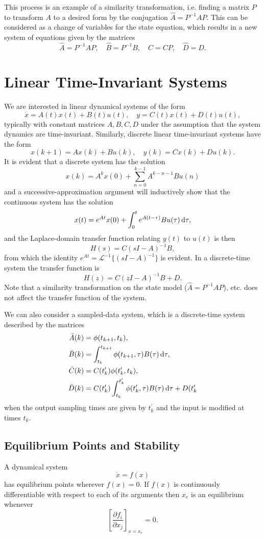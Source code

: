 \documentclass{report}
\begin{document}
This process is an example of a similarity transformation,
i.e. finding a matrix $P$ to transform $A$ to a desired form by the
conjugation $\hat{A} = P^{-1} A P$. This can be considered as a change
of variables for the state equation, which results in a new system of
equations given by the matrices
$$
\hat{A} = P^{-1} A P, \quad
\hat{B} = P^{-1} B, \quad
\hat{C} = C P, \quad
\hat{D} = D.
$$

\section{Linear Time-Invariant Systems}
We are interested in linear dynamical systems of the form
$$
\dot{x} = A(t) x(t) + B(t) u(t), \quad
y = C(t) x(t) + D(t) u(t),
$$
typically with constant matrices $A, B, C, D$ under the assumption
that the system dynamics are time-invariant. Similarly, discrete
linear time-invariant systems have the form
$$
x(k+1) = A x(k) + B u(k), \quad
y(k) = C x(k) + D u(k).
$$
It is evident that a discrete system has the solution
$$
x(k) = A^k x(0) + \sum_{n=0}^{k-1} A^{k-n-1} B u(n)
$$
and a successive-approximation argument will inductively show that the
continuous system has the solution
$$
x(t) = e^{At} x(0) + \int_0^t e^{A(t - \tau)} B u(\tau) \dif \tau,
$$
and the Laplace-domain transfer function relating $y(t)$ to $u(t)$ is then
$$
H(s) = C(sI - A)^{-1} B,
$$
from which the identity $e^{At} = \mathcal{L}^{-1}\{(sI - A)^{-1}\}$
is evident. In a discrete-time system the transfer function is
$$
H(z) = C(zI - A)^{-1} B + D.
$$
Note that a similarity transformation on the state model
($\hat{A} = P^{-1} A P$), etc. does not affect the transfer function of
the system.

We can also consider a sampled-data system, which is a discrete-time
system described by the matrices
\begin{align*}
\bar{A}(k) &= \phi(t_{k+1}, t_k), \\
\bar{B}(k) &=
  \int_{t_k}^{t_{k+1}} \phi(t_{k+1}, \tau) B(\tau) \dif\tau, \\
\bar{C}(k) &= C(t_k^\prime)\phi(t_k^\prime, t_k), \\
\bar{D}(k) &=
  C(t_k^\prime)
  \int_{t_k}^{t_k^\prime} \phi(t_k^\prime, \tau) B(\tau) \dif \tau
+ D(t_k^\prime
\end{align*}
when the output sampling times are given by $t_k^\prime$ and the input
is modified at times $t_k$.

\subsection{Equilibrium Points and Stability}
A dynamical system
$$
\dot{x} = f(x)
$$
has equilibrium points wherever $f(x) = 0$. If $f(x)$ is continuously
differentiable with respect to each of its arguments then $x_e$ is an
equilibrium whenever
$$
\left[\frac{\partial f_i}{\partial x_j}\right]_{x = x_e} = 0.
$$
\end{document}
